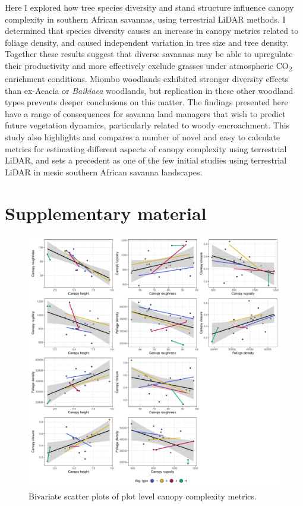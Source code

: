 \begin{refsection}
Here I explored how tree species diversity and stand structure influence canopy complexity in southern African savannas, using terrestrial LiDAR methods. I determined that species diversity causes an increase in canopy metrics related to foliage density, and caused independent variation in tree size and tree density. Together these results suggest that diverse savannas may be able to upregulate their productivity and more effectively exclude grasses under atmospheric CO\textsubscript{2} enrichment conditions. Miombo woodlands exhibited stronger diversity effects than ex-Acacia or \textit{Baikiaea} woodlands, but replication in these other woodland types prevents deeper conclusions on this matter. The findings presented here have a range of consequences for savanna land managers that wish to predict future vegetation dynamics, particularly related to woody encroachment. This study also highlights and compares a number of novel and easy to calculate metrics for estimating different aspects of canopy complexity using terrestrial LiDAR, and sets a precedent as one of the few initial studies using terrestrial LiDAR in mesic southern African savanna landscapes.

\newpage{}
\FloatBarrier{}
\begingroup
{}
\printbibliography[heading=subbibintoc]
\endgroup

\section{Supplementary material}
\label{tls:sec:supp}
\begin{supplement}

	\begin{figure}[H]
	\includegraphics[width=\linewidth]{img/canopy_metric_comp_plot}
	\caption[Bivariate plots of plot canopy complexity metrics]{Bivariate scatter plots of plot level canopy complexity metrics.}
	\label{tls:canopy_metric_comp_plot}
\end{figure}


\end{supplement}
\end{refsection}
